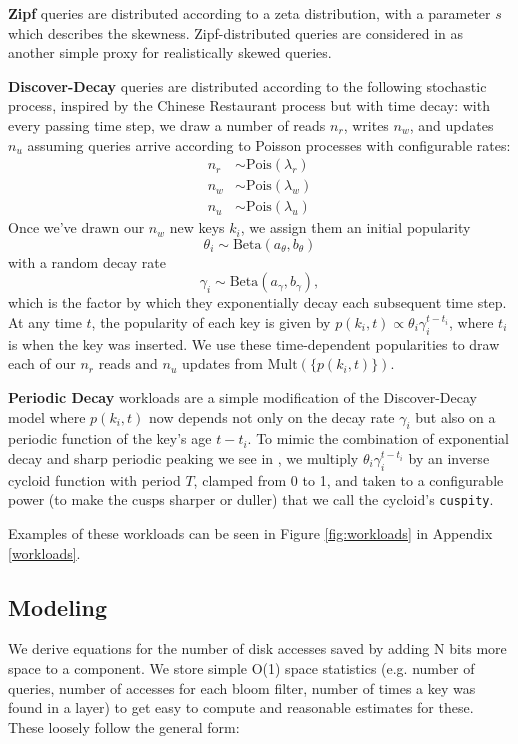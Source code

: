 \documentclass{cidr-2019}
\begin{document}
\textbf{Zipf} queries are distributed according to a zeta distribution, with a
parameter $s$ which describes the skewness. Zipf-distributed queries are
considered in \cite{art} as another simple proxy for realistically skewed
queries.

\textbf{Discover-Decay} queries are distributed according to the following
stochastic process, inspired by the Chinese Restaurant process \cite{crp} but
with time decay: with every passing time step, we draw a number of reads $n_r$,
writes $n_w$, and updates $n_u$ assuming queries arrive according to Poisson
processes with configurable rates: \[
\begin{split}
  n_r & \sim \textrm{Pois}(\lambda_r) \\
  n_w & \sim \textrm{Pois}(\lambda_w) \\
  n_u & \sim \textrm{Pois}(\lambda_u)
\end{split}
\]
Once we've drawn our $n_w$ new keys $k_i$, we assign them an initial popularity
$$
\theta_{i} \sim \textrm{Beta}(a_\theta,b_\theta)
$$
\noindent with a random decay rate
$$
\gamma_i \sim \textrm{Beta}(a_\gamma,b_\gamma),
$$
which is the factor by which they exponentially decay each subsequent time
step. At any time $t$, the popularity of each key is given by $p(k_i,t) \propto
\theta_i\gamma_i^{t-t_i}$, where $t_i$ is when the key was inserted. We use
these time-dependent popularities to draw each of our $n_r$ reads and $n_u$
updates from $\textrm{Mult}(\{p(k_i,t)\})$.

\textbf{Periodic Decay} workloads are a simple modification of the
Discover-Decay model where $p(k_i,t)$ now depends not only on the decay rate
$\gamma_i$ but also on a periodic function of the key's age $t-t_i$.  To mimic
the combination of exponential decay and sharp periodic peaking we see in
\cite{characterizing-memcached}, we multiply $\theta_i\gamma_i^{t-t_i}$ by an
inverse cycloid function with period $T$, clamped from 0 to 1, and taken to a
configurable power (to make the cusps sharper or duller) that we call the
cycloid's \texttt{cuspity}.

Examples of these workloads can be seen in Figure \ref{fig:workloads} in
Appendix \ref{workloads}.

\subsection{Modeling}

We derive equations for the number of disk accesses saved by adding N bits more
space to a component. We store simple O(1) space statistics (e.g. number of
queries, number of accesses for each bloom filter, number of times a key was
found in a layer) to get easy to compute and reasonable estimates for these.
These loosely follow the general form:
\end{document}
